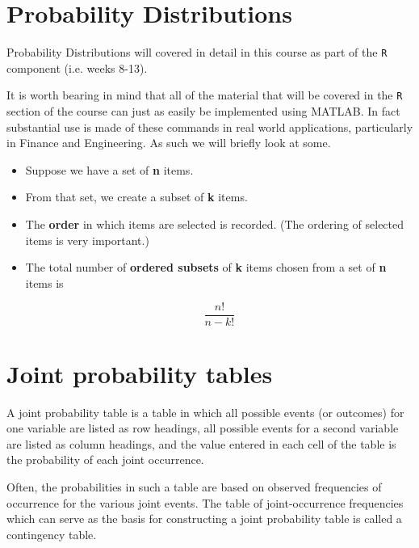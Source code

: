 \documentclass[]{report}
\begin{document}
{\section{Probability Distributions}

Probability Distributions will covered in detail in this course as part of the \texttt{R} component (i.e. weeks 8-13).

It is worth bearing in mind that all of the material that will be covered in the \texttt{R} section of the course can just as easily be implemented using MATLAB. In fact substantial use is made of these commands in real world applications, particularly in Finance and Engineering.
As such we will briefly look at some.





{
\begin{itemize}

\item Suppose we have a set of \textbf{n} items.
\item From that set, we create a subset of \textbf{k} items.
\item The \textbf{order} in which items are selected is recorded. (The ordering of selected items is very important.) 
\item The total number of \textbf{ordered subsets} of \textbf{k} items chosen from a set of \textbf{n} items is

\[\frac{n!}{n-k!}\]
\end{itemize}
}







\section*{Joint probability tables}
A joint probability table is a table in which all possible events (or outcomes) for one variable are listed as
row headings, all possible events for a second variable are listed as column headings, and the value entered in
each cell of the table is the probability of each joint occurrence. 

Often, the probabilities in such a table are based
on observed frequencies of occurrence for the various joint events. The table
of joint-occurrence frequencies which can serve as the basis for constructing a joint probability table is called a
contingency table.

}
\end{document}
